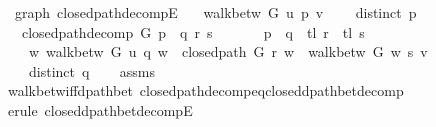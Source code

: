 \begin{isabellebody}
\endisatagproof
{\isafoldproof}%
%
\isadelimproof
\isanewline
%
\endisadelimproof
%
\isadeliminvisible
\isanewline
%
\endisadeliminvisible
%
\isataginvisible
{}\isamarkupfalse%
\ {\isacharparenleft}{\kern0pt}\ graph{\isacharparenright}{\kern0pt}\ closed{\isacharunderscore}{\kern0pt}path{\isacharunderscore}{\kern0pt}decompE{\isacharunderscore}{\kern0pt}{}{\isacharcolon}{\kern0pt}\isanewline
\ \ \ {\isachardoublequoteopen}walk{\isacharunderscore}{\kern0pt}betw\ G\ u\ p\ v{\isachardoublequoteclose}\isanewline
\ \ \ {\isachardoublequoteopen}{\isasymnot}\ distinct\ p{\isachardoublequoteclose}\isanewline
\ \ \ {\isachardoublequoteopen}closed{\isacharunderscore}{\kern0pt}path{\isacharunderscore}{\kern0pt}decomp\ G\ p\ {\isacharequal}{\kern0pt}\ {\isacharparenleft}{\kern0pt}q{\isacharcomma}{\kern0pt}\ r{\isacharcomma}{\kern0pt}\ s{\isacharparenright}{\kern0pt}{\isachardoublequoteclose}\isanewline
\ \ \isanewline
\ \ \ \ {\isachardoublequoteopen}p\ {\isacharequal}{\kern0pt}\ q\ {\isacharat}{\kern0pt}\ tl\ r\ {\isacharat}{\kern0pt}\ tl\ s{\isachardoublequoteclose}\isanewline
\ \ \ \ {\isachardoublequoteopen}{\isasymexists}w{\isachardot}{\kern0pt}\ walk{\isacharunderscore}{\kern0pt}betw\ G\ u\ q\ w\ {\isasymand}\ closed{\isacharunderscore}{\kern0pt}path\ G\ r\ w\ {\isasymand}\ walk{\isacharunderscore}{\kern0pt}betw\ G\ w\ s\ v{\isachardoublequoteclose}\isanewline
\ \ \ \ {\isachardoublequoteopen}distinct\ q{\isachardoublequoteclose}%
\endisataginvisible
{\isafoldinvisible}%
%
\isadeliminvisible
\isanewline
%
\endisadeliminvisible
%
\isadelimproof
\ \ %
\endisadelimproof
%
\isatagproof
{}\isamarkupfalse%
\ assms\isanewline
\ \ \isamarkupfalse%
\ walk{\isacharunderscore}{\kern0pt}betw{\isacharunderscore}{\kern0pt}iff{\isacharunderscore}{\kern0pt}dpath{\isacharunderscore}{\kern0pt}bet\ closed{\isacharunderscore}{\kern0pt}path{\isacharunderscore}{\kern0pt}decomp{\isacharunderscore}{\kern0pt}eq{\isacharunderscore}{\kern0pt}closed{\isacharunderscore}{\kern0pt}dpath{\isacharunderscore}{\kern0pt}bet{\isacharunderscore}{\kern0pt}decomp\isanewline
\ \ \isamarkupfalse%
\ {\isacharparenleft}{\kern0pt}erule\ closed{\isacharunderscore}{\kern0pt}dpath{\isacharunderscore}{\kern0pt}bet{\isacharunderscore}{\kern0pt}decompE{\isacharunderscore}{\kern0pt}{}{\isacharparenright}{\kern0pt}%
\endisatagproof
{\isafoldproof}%
%
\isadelimproof
\isanewline
%
\endisadelimproof
%
\isadeliminvisible
\isanewline

\end{isabellebody}
